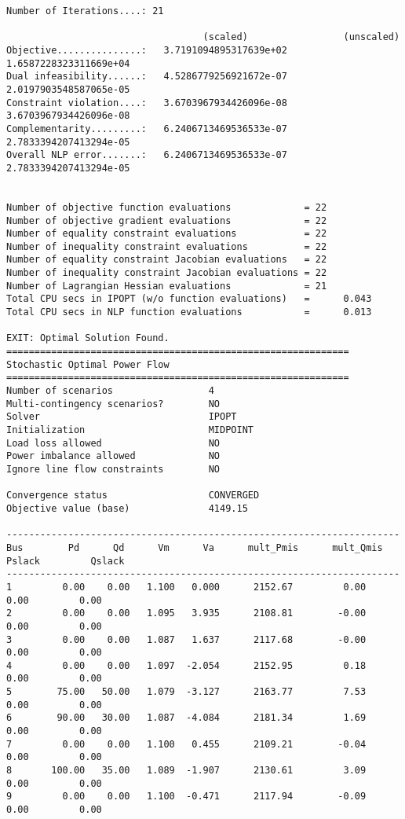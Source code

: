 \begin{lstlisting}
Number of Iterations....: 21

                                   (scaled)                 (unscaled)
Objective...............:   3.7191094895317639e+02    1.6587228323311669e+04
Dual infeasibility......:   4.5286779256921672e-07    2.0197903548587065e-05
Constraint violation....:   3.6703967934426096e-08    3.6703967934426096e-08
Complementarity.........:   6.2406713469536533e-07    2.7833394207413294e-05
Overall NLP error.......:   6.2406713469536533e-07    2.7833394207413294e-05


Number of objective function evaluations             = 22
Number of objective gradient evaluations             = 22
Number of equality constraint evaluations            = 22
Number of inequality constraint evaluations          = 22
Number of equality constraint Jacobian evaluations   = 22
Number of inequality constraint Jacobian evaluations = 22
Number of Lagrangian Hessian evaluations             = 21
Total CPU secs in IPOPT (w/o function evaluations)   =      0.043
Total CPU secs in NLP function evaluations           =      0.013

EXIT: Optimal Solution Found.
=============================================================
Stochastic Optimal Power Flow
=============================================================
Number of scenarios                 4
Multi-contingency scenarios?        NO
Solver                              IPOPT
Initialization                      MIDPOINT
Load loss allowed                   NO
Power imbalance allowed             NO
Ignore line flow constraints        NO

Convergence status                  CONVERGED
Objective value (base)              4149.15

----------------------------------------------------------------------
Bus        Pd      Qd      Vm      Va      mult_Pmis      mult_Qmis      Pslack         Qslack        
----------------------------------------------------------------------
1         0.00    0.00   1.100   0.000      2152.67         0.00         0.00         0.00
2         0.00    0.00   1.095   3.935      2108.81        -0.00         0.00         0.00
3         0.00    0.00   1.087   1.637      2117.68        -0.00         0.00         0.00
4         0.00    0.00   1.097  -2.054      2152.95         0.18         0.00         0.00
5        75.00   50.00   1.079  -3.127      2163.77         7.53         0.00         0.00
6        90.00   30.00   1.087  -4.084      2181.34         1.69         0.00         0.00
7         0.00    0.00   1.100   0.455      2109.21        -0.04         0.00         0.00
8       100.00   35.00   1.089  -1.907      2130.61         3.09         0.00         0.00
9         0.00    0.00   1.100  -0.471      2117.94        -0.09         0.00         0.00


\end{lstlisting}
